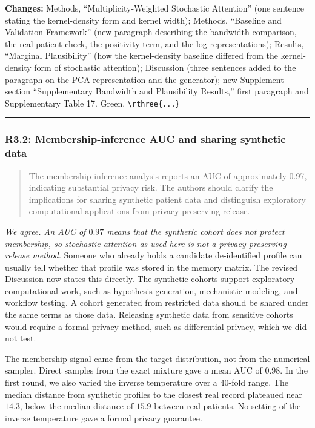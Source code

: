 \documentclass[
  11pt,
  letterpaper,
]{article}
\begin{document}
\textbf{Changes:} Methods, ``Multiplicity-Weighted Stochastic
Attention'' (one sentence stating the kernel-density form and kernel
width); Methods, ``Baseline and Validation Framework'' (new paragraph
describing the bandwidth comparison, the real-patient check, the
positivity term, and the log representations); Results, ``Marginal
Plausibility'' (how the kernel-density baseline differed from the
kernel-density form of stochastic attention); Discussion (three
sentences added to the paragraph on the PCA representation and the
generator); new Supplement section ``Supplementary Bandwidth and
Plausibility Results,'' first paragraph and Supplementary Table 17.
Green. \texttt{\textbackslash{}rthree\{...\}}

\begin{center}\rule{0.5\linewidth}{0.5pt}\end{center}

\subsubsection{R3.2: Membership-inference AUC and sharing synthetic
data}\label{r3.2-membership-inference-auc-and-sharing-synthetic-data}

\begin{quote}
The membership-inference analysis reports an AUC of approximately 0.97,
indicating substantial privacy risk. The authors should clarify the
implications for sharing synthetic patient data and distinguish
exploratory computational applications from privacy-preserving release.
\end{quote}

\emph{We agree. An AUC of \(0.97\) means that the synthetic cohort does
not protect membership, so stochastic attention as used here is not a
privacy-preserving release method.} Someone who already holds a
candidate de-identified profile can usually tell whether that profile
was stored in the memory matrix. The revised Discussion now states this
directly. The synthetic cohorts support exploratory computational work,
such as hypothesis generation, mechanistic modeling, and workflow
testing. A cohort generated from restricted data should be shared under
the same terms as those data. Releasing synthetic data from sensitive
cohorts would require a formal privacy method, such as differential
privacy, which we did not test.

The membership signal came from the target distribution, not from the
numerical sampler. Direct samples from the exact mixture gave a mean AUC
of \(0.98\). In the first round, we also varied the inverse temperature
over a \(40\)-fold range. The median distance from synthetic profiles to
the closest real record plateaued near \(14.3\), below the median
distance of \(15.9\) between real patients. No setting of the inverse
temperature gave a formal privacy guarantee.
\end{document}
